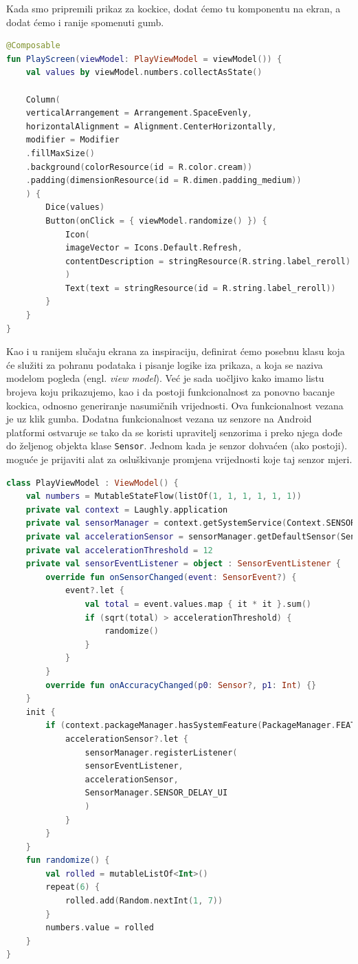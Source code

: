 \documentclass[11pt,a4paper,twoside]{article}
\begin{document}
Kada smo pripremili prikaz za kockice, dodat ćemo tu komponentu na ekran, a dodat ćemo i ranije spomenuti gumb. 

\begin{lstlisting}[caption={Ekran za igru - PlayScreen.kt}, label={lst:screen-play}, language=Kotlin]
@Composable
fun PlayScreen(viewModel: PlayViewModel = viewModel()) {
	val values by viewModel.numbers.collectAsState()
	
	Column(
	verticalArrangement = Arrangement.SpaceEvenly,
	horizontalAlignment = Alignment.CenterHorizontally,
	modifier = Modifier
	.fillMaxSize()
	.background(colorResource(id = R.color.cream))
	.padding(dimensionResource(id = R.dimen.padding_medium))
	) {
		Dice(values)
		Button(onClick = { viewModel.randomize() }) {
			Icon(
			imageVector = Icons.Default.Refresh,
			contentDescription = stringResource(R.string.label_reroll)
			)
			Text(text = stringResource(id = R.string.label_reroll))
		}
	}
}
\end{lstlisting}

Kao i u ranijem slučaju ekrana za inspiraciju, definirat ćemo posebnu klasu koja će služiti za pohranu podataka i pisanje logike iza prikaza, a koja se naziva modelom pogleda (engl. \textit{view model}). Već je sada uočljivo kako imamo listu brojeva koju prikazujemo, kao i da postoji funkcionalnost za ponovno bacanje kockica, odnosno generiranje nasumičnih vrijednosti. Ova funkcionalnost vezana je uz klik gumba. Dodatna funkcionalnost vezana uz senzore na Android platformi ostvaruje se tako da se koristi upravitelj senzorima i preko njega dođe do željenog objekta klase \texttt{Sensor}. Jednom kada je senzor dohvaćen (ako postoji). moguće je prijaviti alat za osluškivanje promjena vrijednosti koje taj senzor mjeri.

\begin{lstlisting}[caption={Model pogleda za igru - PlayViewModel.kt}, label={lst:viewmodel-play}, language=Kotlin]
class PlayViewModel : ViewModel() {
	val numbers = MutableStateFlow(listOf(1, 1, 1, 1, 1, 1))
	private val context = Laughly.application
	private val sensorManager = context.getSystemService(Context.SENSOR_SERVICE) as SensorManager
	private val accelerationSensor = sensorManager.getDefaultSensor(Sensor.TYPE_ACCELEROMETER)
	private val accelerationThreshold = 12
	private val sensorEventListener = object : SensorEventListener {
		override fun onSensorChanged(event: SensorEvent?) {
			event?.let {
				val total = event.values.map { it * it }.sum()
				if (sqrt(total) > accelerationThreshold) {
					randomize()
				}
			}
		}
		override fun onAccuracyChanged(p0: Sensor?, p1: Int) {}
	}
	init {
		if (context.packageManager.hasSystemFeature(PackageManager.FEATURE_SENSOR_ACCELEROMETER)) {
			accelerationSensor?.let {
				sensorManager.registerListener(
				sensorEventListener,
				accelerationSensor,
				SensorManager.SENSOR_DELAY_UI
				)
			}
		}
	}
	fun randomize() {
		val rolled = mutableListOf<Int>()
		repeat(6) {
			rolled.add(Random.nextInt(1, 7))
		}
		numbers.value = rolled
	}
}
\end{lstlisting}
\end{document}
